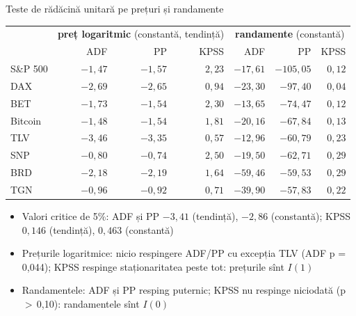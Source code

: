 \begin{frame}{Teste de rădăcină unitară pe prețuri și randamente}
\itemsize{\footnotesize}
\begin{center}
\scriptsize
\begin{tabular}{lrrrrrr}
\toprule
& \multicolumn{3}{c}{\textbf{preț logaritmic} (constantă, tendință)} & \multicolumn{3}{c}{\textbf{randamente} (constantă)} \\ & ADF & PP & KPSS & ADF & PP & KPSS \\
\midrule
S\&P 500 & ${-1{,}47}$ & ${-1{,}57}$ & ${2{,}23}$ & ${-17{,}61}$ & ${-105{,}05}$ & ${0{,}12}$ \\
DAX & ${-2{,}69}$ & ${-2{,}65}$ & ${0{,}94}$ & ${-23{,}30}$ & ${-97{,}40}$ & ${0{,}04}$ \\
BET & ${-1{,}73}$ & ${-1{,}54}$ & ${2{,}30}$ & ${-13{,}65}$ & ${-74{,}47}$ & ${0{,}12}$ \\
Bitcoin & ${-1{,}48}$ & ${-1{,}54}$ & ${1{,}81}$ & ${-20{,}16}$ & ${-67{,}84}$ & ${0{,}13}$ \\
TLV & ${-3{,}46}$ & ${-3{,}35}$ & ${0{,}57}$ & ${-12{,}96}$ & ${-60{,}79}$ & ${0{,}23}$ \\
SNP & ${-0{,}80}$ & ${-0{,}74}$ & ${2{,}50}$ & ${-19{,}50}$ & ${-62{,}71}$ & ${0{,}29}$ \\
BRD & ${-2{,}18}$ & ${-2{,}19}$ & ${1{,}64}$ & ${-59{,}46}$ & ${-59{,}53}$ & ${0{,}29}$ \\
TGN & ${-0{,}96}$ & ${-0{,}92}$ & ${0{,}71}$ & ${-39{,}90}$ & ${-57{,}83}$ & ${0{,}22}$ \\
\bottomrule
\end{tabular}
\end{center}
\begin{itemize}
    \item Valori critice de 5\%: ADF și PP $-3{,}41$ (tendință), $-2{,}86$ (constantă); KPSS $0{,}146$ (tendință), $0{,}463$ (constantă)
    \item Prețurile logaritmice: nicio respingere ADF/PP cu excepția TLV (ADF p = 0{,}044); KPSS respinge staționaritatea peste tot: prețurile sînt $I(1)$
    \item Randamentele: ADF și PP resping puternic; KPSS nu respinge niciodată (p $>$\,0{,}10): randamentele sînt $I(0)$
\end{itemize}
\end{frame}


